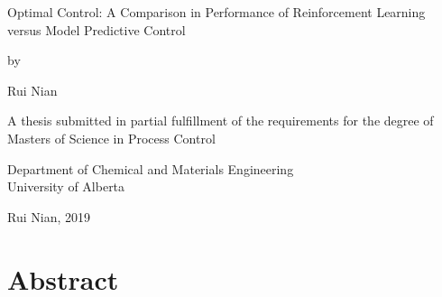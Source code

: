 \documentclass[12pt]{report}
\begin{document}
\begin{titlepage}
    \begin{center}
    
        \vspace*{2cm}
        
        \LARGE
        Optimal Control: A Comparison in Performance of Reinforcement Learning versus Model Predictive Control \\
        
        \vspace{1cm}
        
        \normalsize by \\
        
        \vspace{1cm}
        
        \large Rui Nian \\
        
        \vspace{3.5cm}
        
        A thesis submitted in partial fulfillment of the requirements for the degree of \\
        \vspace{1cm}
        Masters of Science in Process Control \\
        
        \vspace{4cm}
        
        Department of Chemical and Materials Engineering \\
        University of Alberta \\
        
        \vspace{1.5cm}
        
        \textcopyright \hspace{1mm} Rui Nian, 2019 \\
        

    \end{center}
\end{titlepage}



\chapter*{Abstract}
\end{document}
